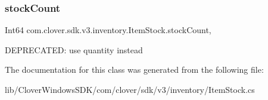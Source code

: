 \subsubsection{\texorpdfstring{stock\+Count}{stockCount}}
{\footnotesize\ttfamily Int64 com.\+clover.\+sdk.\+v3.\+inventory.\+Item\+Stock.\+stock\+Count\hspace{0.3cm}{\ttfamily [get]}, {\ttfamily [set]}}



D\+E\+P\+R\+E\+C\+A\+T\+ED\+: use quantity instead 



The documentation for this class was generated from the following file\+:\begin{DoxyCompactItemize}
\item 
lib/\+Clover\+Windows\+S\+D\+K/com/clover/sdk/v3/inventory/Item\+Stock.\+cs\end{DoxyCompactItemize}
